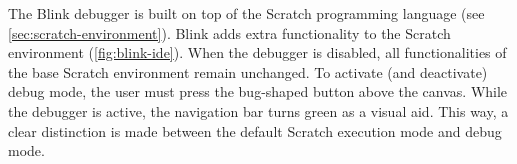 \documentclass[../main]{subfiles}
\begin{document}
%


The Blink debugger is built on top of the Scratch programming language (see \cref{sec:scratch-environment}).
Blink adds extra functionality to the Scratch environment (\cref{fig:blink-ide}).
When the debugger is disabled, all functionalities of the base Scratch environment remain unchanged.
To activate (and deactivate) debug mode, the user must press the bug-shaped button above the canvas.
While the debugger is active, the navigation bar turns green as a visual aid.
This way, a clear distinction is made between the default Scratch execution mode and debug mode.
\end{document}
